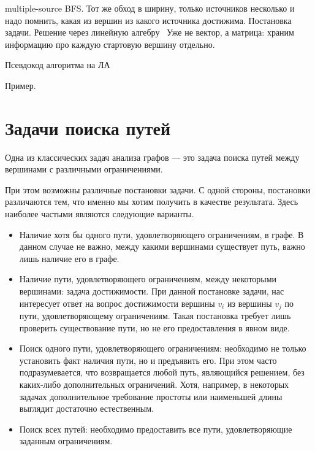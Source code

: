 multiple-source BFS. Тот же обход в ширину, только источников несколько и надо помнить, какая из вершин из какого источника достижима. Постановка задачи. Решение через линейную алгебру~\cite{9286186} Уже не вектор, а матрица: храним информацию про каждую стартовую вершину отдельно.

Псевдокод алгоритма на ЛА

Пример.

\begin{minipage}[c]{0.35\textwidth}
  
\end{minipage}
\begin{minipage}{0.7\textwidth}
\end{minipage}


\begin{minipage}[c]{0.35\textwidth}
  
\end{minipage}
\begin{minipage}{0.7\textwidth}
\end{minipage}


\section{Задачи поиска путей}

Одна из классических задач анализа графов --- это задача поиска путей между вершинами с различными ограничениями.

При этом возможны различные постановки задачи.
С одной стороны, постановки различаются тем, что именно мы хотим получить в качестве результата. Здесь наиболее частыми являются следующие варианты.

\begin{itemize}
\item Наличие хотя бы одного пути, удовлетворяющего ограничениям, в графе. В данном случае не важно, между какими вершинами существует путь, важно лишь наличие его в графе.

\item Наличие пути, удовлетворяющего ограничениям, между некоторыми вершинами: задача достижимости.
      При данной постановке задачи, нас интересует ответ на вопрос достижимости вершины $v_i$ из вершины $v_j$ по пути, удовлетворяющему ограничениям.
      Такая постановка требует лишь проверить существование пути, но не его предоставления в явном виде.

\item Поиск одного пути, удовлетворяющего ограничениям: необходимо не только установить факт наличия пути, но и  предъявить его. При этом часто подразумевается, что возвращается любой путь, являющийся решением, без каких-либо дополнительных ограничений. Хотя, например, в некоторых задачах дополнительное требование простоты или наименьшей длины выглядит достаточно естественным.

\item Поиск всех путей: необходимо предоставить все пути, удовлетворяющие заданным ограничениям.
\end{itemize}

